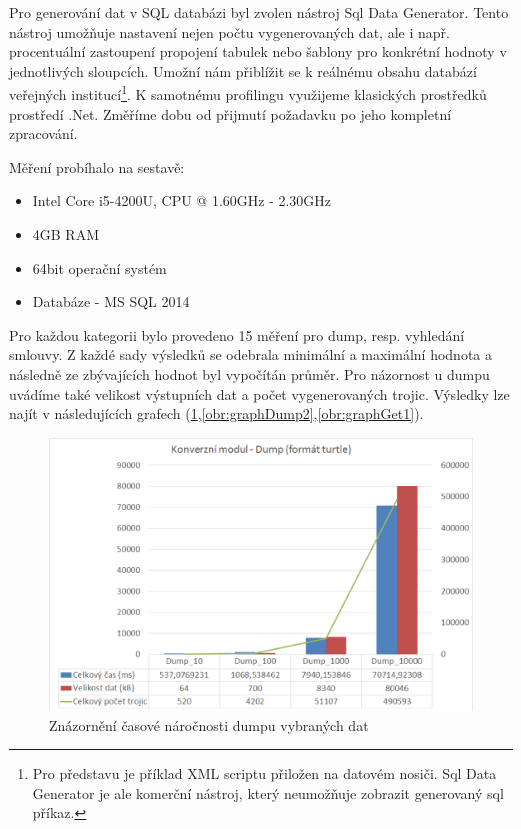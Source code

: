 Pro generování dat v SQL databázi byl zvolen nástroj Sql Data Generator. Tento nástroj umožňuje nastavení nejen počtu vygenerovaných dat, ale i např. procentuální zastoupení propojení tabulek nebo šablony pro konkrétní hodnoty v jednotlivých sloupcích. Umožní nám přiblížit se k reálnému obsahu databází veřejných institucí\footnote{Pro představu je příklad XML scriptu přiložen na datovém nosiči. Sql Data Generator je ale komerční nástroj, který neumožňuje zobrazit generovaný sql příkaz.}. K samotnému profilingu využijeme klasických prostředků prostředí .Net. Změříme dobu od přijmutí požadavku po jeho kompletní zpracování.
\newpage

Měření probíhalo na sestavě:
\begin{itemize}
\item Intel Core i5-4200U, CPU @ 1.60GHz - 2.30GHz
\item 4GB RAM
\item 64bit operační systém
\item Databáze - MS SQL 2014
\end{itemize}

Pro každou kategorii bylo provedeno 15 měření pro dump, resp. vyhledání smlouvy. Z každé sady výsledků se odebrala minimální a maximální hodnota a následně ze zbývajících hodnot byl vypočítán průměr. Pro názornost u dumpu uvádíme také velikost výstupních dat a počet vygenerovaných trojic. Výsledky lze najít v následujících grafech (\ref{obr:graphDump1},\ref{obr:graphDump2},\ref{obr:graphGet1}).

\begin{figure}[H]
\centerline{\includegraphics[width=\textwidth]{img/graphDump1.eps}}
\caption{Znázornění časové náročnosti dumpu vybraných dat}
\label{obr:graphDump1}
\end{figure}

